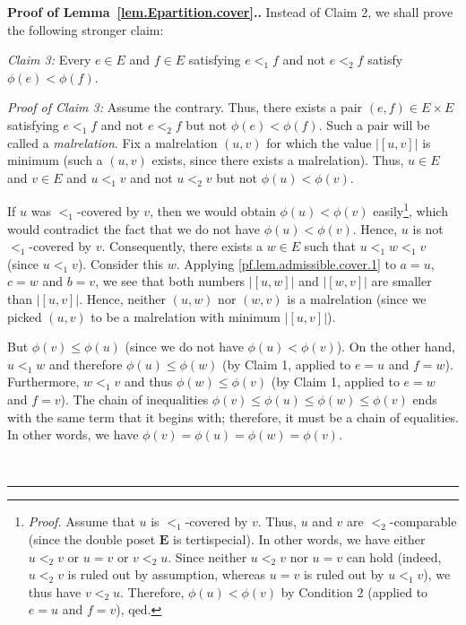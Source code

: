 \documentclass[numbers=enddot,12pt,final,onecolumn,notitlepage,abstracton]{scrartcl}%
\theoremstyle{definition}
\newenvironment{proof}[1][Proof]{\noindent\textbf{#1.} }{\ \rule{0.5em}{0.5em}}
\newcommand{\EE}{{\mathbf{E}}}
\begin{document}
\begin{proof}[Proof of Lemma~\ref{lem.Epartition.cover}.]
Instead of Claim 2, we shall prove the following stronger claim:

\textit{Claim 3:} Every $e \in E$ and $f \in E$ satisfying
$e <_1 f$ and not $e <_2 f$ satisfy
$\phi\left(e\right) < \phi\left(f\right)$.

\textit{Proof of Claim 3:} Assume the contrary. Thus, there
exists a pair $\left(e, f\right) \in E \times E$ satisfying
$e <_1 f$ and not $e <_2 f$ but not
$\phi\left(e\right) < \phi\left(f\right)$.
Such a pair will be called a \textit{malrelation}. Fix a
malrelation $\left(u, v\right)$ for which the value
$\left|\left[u, v\right]\right|$ is minimum (such a
$\left(u, v\right)$ exists, since there exists a malrelation).
Thus, $u \in E$ and $v \in E$ and $u <_1 v$ and not $u <_2 v$
but not $\phi\left(u\right) < \phi\left(v\right)$.

If $u$ was $<_1$-covered by $v$, then we would obtain
$\phi\left(u\right) < \phi\left(v\right)$
easily\footnote{\textit{Proof.} Assume that $u$ is
$<_1$-covered by $v$. Thus, $u$ and $v$ are $<_2$-comparable
(since the double poset $\EE$ is tertispecial). In other words,
we have either $u <_2 v$ or $u = v$ or $v <_2 u$. Since
neither $u <_2 v$ nor $u = v$ can hold (indeed, $u <_2 v$
is ruled out by assumption, whereas $u = v$ is ruled out by
$u <_1 v$), we thus have $v <_2 u$. Therefore,
$\phi\left(u\right) < \phi\left(v\right)$
by Condition 2 (applied to $e = u$ and $f = v$), qed.}, which
would contradict the fact that we do not have
$\phi\left(u\right) < \phi\left(v\right)$. Hence, $u$ is not
$<_1$-covered by $v$. Consequently, there exists a $w \in E$
such that $u <_1 w <_1 v$ (since $u <_1 v$). Consider this
$w$. Applying \eqref{pf.lem.admissible.cover.1} to $a = u$,
$c = w$ and $b = v$, we see that both numbers
$\left|\left[u, w\right]\right|$ and
$\left|\left[w, v\right]\right|$ are smaller than
$\left|\left[u, v\right]\right|$. Hence, neither
$\left(u, w\right)$ nor $\left(w, v\right)$ is a malrelation
(since we picked $\left(u, v\right)$ to be a malrelation with
minimum $\left|\left[u, v\right]\right|$).

But $\phi\left(v\right) \leq \phi\left(u\right)$ (since we do
not have $\phi\left(u\right) < \phi\left(v\right)$). On the
other hand, $u <_1 w$ and therefore $\phi\left(u\right) \leq
\phi\left(w\right)$ (by Claim 1, applied to $e = u$ and
$f = w$). Furthermore, $w <_1 v$ and
thus $\phi\left(w\right) \leq \phi\left(v\right)$ (by Claim 1,
applied to $e = w$ and $f = v$).
The chain of inequalities
$\phi\left(v\right) \leq \phi\left(u\right)
\leq \phi\left(w\right) \leq \phi\left(v\right)$ ends with
the same term that it begins with; therefore, it must be a chain
of equalities. In other words, we have
$\phi\left(v\right) = \phi\left(u\right)
= \phi\left(w\right) = \phi\left(v\right)$.


\end{proof}
\end{document}
